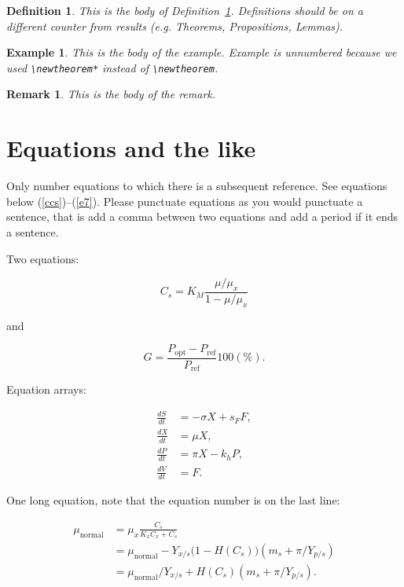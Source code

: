 \documentclass[qe,nameyear,final,supplement,openaccess]{econsocart}
\theoremstyle{plain}
\newtheorem{definition}{Definition}[section]
\newtheorem{example}{Example}[section]
\newtheorem{remark}{Remark}[section]
\begin{document}
\begin{definition}\label{de1}This is the body of Definition~\ref{de1}. Definitions should be on a different counter from results (e.g. Theorems, Propositions, Lemmas).

\end{definition}\begin{example}This is the body of the example. Example is unnumbered because we used \texttt{{\textbackslash}newtheorem*}
instead of \texttt{{\textbackslash}newtheorem}.

\end{example}\begin{remark}This is the body of the remark.

\end{remark}\section{Equations and the like}

Only number equations to which there is a subsequent reference.
See equations below (\ref{ccs})--(\ref{e7}). Please punctuate equations as you would punctuate a sentence, that is add a comma between two equations and add a period if it ends a sentence.

Two equations:

\begin{equation}
\label{ccs}
C_{s}  =  K_{M} \frac{\mu/\mu_{x}}{1-\mu/\mu_{x}}
\end{equation}

and

\begin{equation}
G = \frac{P_{\mathrm{opt}} - P_{\mathrm{ref}}}{P_{\mathrm{ref}}}  100(\%).
\end{equation}

Equation arrays:

\begin{align}
  \frac{dS}{dt} & = - \sigma X + s_{F} F,\\
  \frac{dX}{dt} & =   \mu    X,\\
  \frac{dP}{dt} & =   \pi    X - k_{h} P,\\
  \frac{dV}{dt} & =   F.
\end{align}

One long equation, note that the equation number is on the last line:

\begin{equation}
\label{e7}
\begin{aligned}
 \mu_{\text{normal}} & = \mu_{x} \frac{C_{s}}{K_{x}C_{x}+C_{s}} \\
                     & = \mu_{\text{normal}} - Y_{x/s}\bigl(1-H(C_{s})\bigr)(m_{s}+\pi /Y_{p/s})\\
                     & = \mu_{\text{normal}}/Y_{x/s}+ H(C_{s}) (m_{s}+ \pi /Y_{p/s}).
\end{aligned}
\end{equation}
\end{document}
